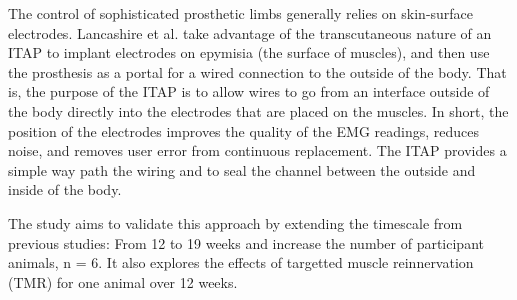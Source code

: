The control of sophisticated prosthetic limbs generally relies on skin-surface electrodes.
Lancashire et al. take advantage of the transcutaneous nature of an ITAP to implant electrodes on epymisia (the surface of muscles), and then use the prosthesis as a portal for a wired connection to the outside of the body.
That is, the purpose of the ITAP is to allow wires to go from an interface outside of the body directly into the electrodes that are placed on the muscles.
In short, the position of the electrodes improves the quality of the EMG readings, reduces noise, and removes user error from continuous replacement.
The ITAP provides a simple way path the wiring and to seal the channel between the outside and inside of the body.

The study aims to validate this approach by extending the timescale from previous studies: From 12 to 19 weeks and increase the number of participant animals, n = 6.
It also explores the effects of targetted muscle reinnervation (TMR) for one animal over 12 weeks.